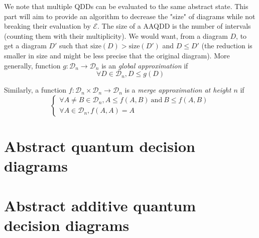 We note that multiple QDDs can be evaluated to the same abstract state. This part will aim to provide an algorithm to decrease the "size" of diagrams while not breaking their evaluation by $\mathcal{E}$. The size of a AAQDD is the number of intervals (counting them with their multiplicity). We would want, from a diagram $D$, to get a diagram $D'$ such that $\text{size}(D) > \text{size}(D')$ and $D \le D'$ (the reduction is smaller in size and might be less precise that the original diagram). More generally, function $g : \mathcal{D}_n \rightarrow \mathcal{D}_n$ is an \textit{global approximation} if
$$\forall D \in \mathcal{D}_n, D \le g(D)$$

Similarly, a function $f : \mathcal{D}_n \times \mathcal{D}_n \rightarrow \mathcal{D}_n$ is a \textit{merge approximation at height $n$} if
$$\begin{cases}
    \forall A \not= B \in \mathcal{D}_n, A \le f(A, B)~\text{and}~B \le f(A, B) \\
    \forall A \in \mathcal{D}_n, f(A, A) = A
\end{cases}
$$

\section{Abstract quantum decision diagrams}



\section{Abstract additive quantum decision diagrams}


